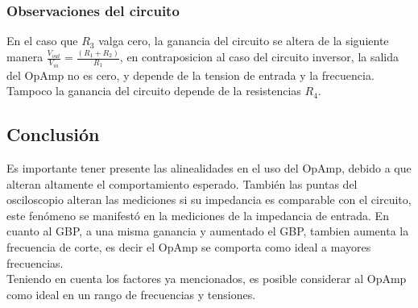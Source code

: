 \documentclass[../../main.tex]{subfiles}
\begin{document}
\subsubsection{Observaciones del circuito}
En el caso que $R_{3}$ valga cero, la ganancia del circuito se altera de la siguiente manera $ \frac{V_{out}}{V_{in}}=\frac {(R_{1}+R_{2})}{R_{1}}$, en contraposicion al caso del circuito inversor, la salida del OpAmp no es cero, y depende de la tension de entrada y la frecuencia. Tampoco la ganancia del circuito depende de la resistencias $R_{4}$.


\subsection{Conclusión}
Es importante tener presente las alinealidades en el uso del OpAmp, debido a que alteran altamente el comportamiento esperado. 
También las puntas del osciloscopio alteran las mediciones si su impedancia es comparable con el circuito, este fenómeno se manifestó en la mediciones de la impedancia de entrada.
En cuanto al GBP, a una misma ganancia y aumentado el GBP, tambien aumenta la frecuencia de corte, es decir el OpAmp se comporta como ideal a mayores frecuencias. 
\\
Teniendo en cuenta los factores ya mencionados, es posible considerar al OpAmp como ideal en un rango de frecuencias y tensiones.
\end{document}
